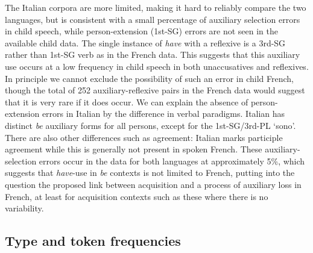 \documentclass[
  12pt,
]{article}
\begin{document}
\begin{enumerate}[resume*]
\begin{enumerate}[resume*]
\begin{enumerate}[resume*]
\begin{enumerate}[resume*]
\begin{enumerate}[resume*]
The Italian corpora are more limited, making it hard to reliably compare the two languages, but is consistent with a small percentage of auxiliary selection errors in child speech, while person-extension (1st-SG) errors are not seen in the available child data. The single instance of \emph{have} with a reflexive is a 3rd-SG rather than 1st-SG verb as in the French data. This suggests that this auxiliary use occurs at a low frequency in child speech in both unaccusatives and reflexives. In principle we cannot exclude the possibility of such an error in child French, though the total of 252 auxiliary-reflexive pairs in the French data would suggest that it is very rare if it does occur. We can explain the absence of person-extension errors in Italian by the difference in verbal paradigms. Italian has distinct \emph{be} auxiliary forms for all persons, except for the 1st-SG/3rd-PL `sono'. There are also other differences such as agreement: Italian marks participle agreement while this is generally not present in spoken French. These auxiliary-selection errors occur in the data for both languages at approximately 5\%, which suggests that \emph{have}-use in \emph{be} contexts is not limited to French, putting into the question the proposed link between acquisition and a process of auxiliary loss in French, at least for acquisition contexts such as these where there is no variability.

\hypertarget{type-and-token-frequencies}{%
\subsection{Type and token frequencies}\label{type-and-token-frequencies}}


\end{enumerate}
\end{enumerate}
\end{enumerate}
\end{enumerate}
\end{enumerate}
\end{document}
